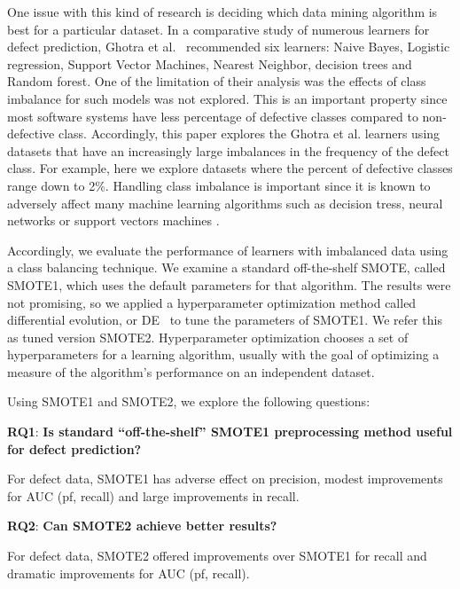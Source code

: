\documentclass[10pt,conference]{IEEEtran}
\theoremstyle{break}
\theoremstyle{break}
\begin{document}
One issue with this kind of research is deciding
which data mining algorithm is best for a particular
dataset. In a comparative study of numerous
learners for defect prediction, Ghotra et al.~\cite{ghotra2015revisiting} recommended six learners: Naive Bayes, Logistic regression, Support Vector Machines, Nearest Neighbor, decision trees and Random forest. One of the limitation of their
analysis was the effects of class imbalance for such models was not explored.
This is an important property
since most software systems have less percentage of defective classes compared to non-defective class. Accordingly, this paper
explores the Ghotra et al. learners using datasets that have an increasingly large imbalances
in the frequency of the defect class. For
example, here we explore datasets where the percent
of defective classes
range down to 2\%. 
Handling class imbalance is important
since it is known to adversely affect
many machine learning algorithms such as decision tress,
neural networks or support vectors machines \cite{japkowicz2002class}. 

Accordingly, we evaluate the performance of learners with imbalanced data using a class balancing technique.
We examine a standard off-the-shelf SMOTE, called SMOTE1, which uses
the default parameters for that algorithm. 
The results were not promising,
so we applied a hyperparameter optimization
method called differential evolution, or DE~\cite{storn1997differential} to tune the parameters of SMOTE1. 
We refer this as tuned version SMOTE2. Hyperparameter optimization chooses a set of hyperparameters for a learning algorithm, usually with the goal of optimizing a measure of the algorithm's performance on an independent dataset.

Using SMOTE1 and SMOTE2, we
explore  the following  questions:  
 
  \textbf{RQ1}: \textbf{Is standard ``off-the-shelf'' SMOTE1 preprocessing method useful for defect prediction?} 

 \begin{lesson}For defect data, SMOTE1 has adverse effect on 
 precision, modest improvements for AUC (pf, recall) and large improvements in recall.
 \end{lesson}

 \textbf{RQ2}: \textbf{Can SMOTE2 achieve better results?} 
 
 \begin{lesson}For defect data, SMOTE2  
 offered    improvements over SMOTE1 for recall
 and dramatic improvements for AUC (pf, recall).
 \end{lesson}
 
\end{document}
